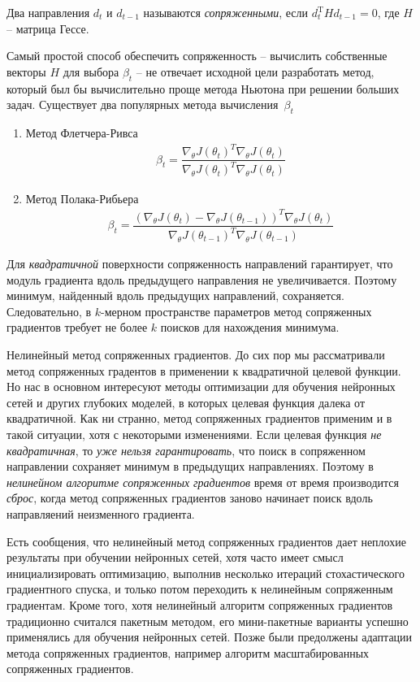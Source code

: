 \documentclass[%
	11pt,
	a4paper,
	utf8,
]{article}
\begin{document}
Два направления $ d_t $ и $ d_{t-1} $ называются \emph{сопряженными}, если $ d_t^\text{T} H d_{t-1} = 0 $, где $ H $ -- матрица Гессе.

Самый простой способ обеспечить сопряженность -- вычислить собственные векторы $ H $ для выбора $ \beta_t $ -- не отвечает исходной цели разработать метод, который был бы вычислительно проще метода Ньютона при решении больших задач. Существует два популярных метода вычисления~$ \beta_t $
\begin{enumerate}
	\item Метод Флетчера-Ривса
\begin{align*}
	\beta_t = \dfrac{ \nabla_\theta J(\theta_t)^T \nabla_\theta J(\theta_t) }{ \nabla_\theta J(\theta_t)^T \nabla_\theta J(\theta_t) }
\end{align*}

    \item Метод Полака-Рибьера
\begin{align*}
	\beta_t = \dfrac{ (\nabla_\theta J(\theta_t) - \nabla_\theta J(\theta_{t-1}))^T \nabla_\theta J(\theta_t) }{ \nabla_\theta J(\theta_{t-1})^T \nabla_\theta J(\theta_{t-1}) }
\end{align*}
\end{enumerate}

Для \emph{квадратичной} поверхности сопряженность направлений гарантирует, что модуль градиента вдоль предыдущего направления не увеличивается. {\color{blue}Поэтому минимум, найденный вдоль предыдущих направлений, сохраняется}. Следовательно, в $ k $-мерном пространстве параметров метод сопряженных градиентов требует не более $ k $ поисков для нахождения минимума.

Нелинейный метод сопряженных градиентов. До сих пор мы рассматривали метод сопряженных градентов в применении к квадратичной целевой функции. Но нас в основном интересуют методы оптимизации для обучения нейронных сетей и других глубоких моделей, в которых целевая функция далека от квадратичной. Как ни странно, метод сопряженных градиентов применим и в такой ситуации, хотя с некоторыми изменениями. {\color{red}Если целевая функция \emph{не квадратичная}, то \emph{уже нельзя гарантировать}, что поиск в сопряженном направлении сохраняет минимум в предыдущих направлениях}. Поэтому в \emph{нелинейном алгоритме сопряженных градиентов} время от время производится \emph{сброс}, когда метод сопряженных градиентов заново начинает поиск вдоль направляений неизменного градиента.

Есть сообщения, что нелинейный метод сопряженных градиентов дает неплохие результаты при обучении нейронных сетей, хотя часто имеет смысл инициализировать оптимизацию, выполнив несколько итераций стохастического градиентного спуска, и только потом переходить к нелинейным сопряженным градиентам. Кроме того, хотя нелинейный алгоритм сопряженных градиентов традиционно считался пакетным методом, его мини-пакетные варианты успешно применялись для обучения нейронных сетей. Позже были предолжены адаптации метода сопряженных градиентов, например алгоритм масштабированных сопряженных градиентов.
\end{document}

